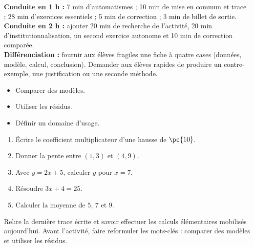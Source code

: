 \ifmxteacher
\begin{method}
\textbf{Conduite en 1 h :} 7 min d'automatismes ; 10 min de mise en commun et trace ; 28 min d'exercices essentiels ; 5 min de correction ; 3 min de billet de sortie.\\
\textbf{Conduite en 2 h :} ajouter 20 min de recherche de l'activité, 20 min d'institutionnalisation, un second exercice autonome et 10 min de correction comparée.\\
\textbf{Différenciation :} fournir aux élèves fragiles une fiche à quatre cases (données, modèle, calcul, conclusion). Demander aux élèves rapides de produire un contre-exemple, une justification ou une seconde méthode.
\end{method}
\fi
{}
\begin{objectives}\begin{itemize}\item Comparer des modèles.\item Utiliser les résidus.\item Définir un domaine d'usage.\end{itemize}\end{objectives}
\begin{fluency}\begin{enumerate}\item Écrire le coefficient multiplicateur d'une hausse de $\pc{10}$. \item Donner la pente entre $(1,3)$ et $(4,9)$. \item Avec $y=2x+5$, calculer $y$ pour $x=7$. \item Résoudre $3x+4=25$. \item Calculer la moyenne de $5$, $7$ et $9$. \end{enumerate}\end{fluency}
\begin{prerequisites}Relire la dernière trace écrite et savoir effectuer les calculs élémentaires mobilisés aujourd'hui. Avant l'activité, faire reformuler les mots-clés : comparer des modèles et utiliser les résidus.\end{prerequisites}

